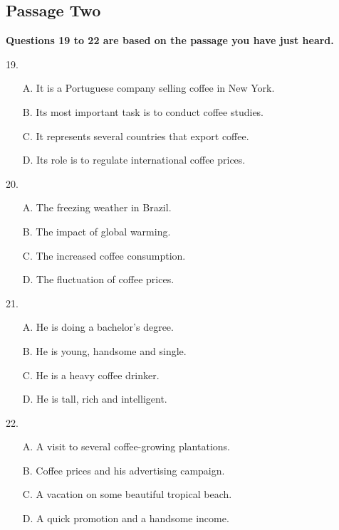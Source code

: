 \documentclass[UTF8,11pt]{ctexart}
\begin{document}
\subsection*{\textbf{Passage Two}}


\textbf{Questions 19 to 22 are based on the passage you have just heard.}


19.


\begin{itemize}[leftmargin=2em,itemsep=.2em,topsep=.4em]\item[A.] It is a Portuguese company selling coffee in New York.
\item[B.] Its most important task is to conduct coffee studies.
\item[C.] It represents several countries that export coffee.
\end{itemize}

\begin{itemize}[leftmargin=2em,itemsep=.2em,topsep=.4em]\item[D.] Its role is to regulate international coffee prices.
\end{itemize}

20.


\begin{itemize}[leftmargin=2em,itemsep=.2em,topsep=.4em]\item[A.] The freezing weather in Brazil.
\item[B.] The impact of global warming.
\item[C.] The increased coffee consumption.
\item[D.] The fluctuation of coffee prices.
\end{itemize}

21.


\begin{itemize}[leftmargin=2em,itemsep=.2em,topsep=.4em]\item[A.] He is doing a bachelor’s degree.
\item[B.] He is young, handsome and single.
\item[C.] He is a heavy coffee drinker.
\item[D.] He is tall, rich and intelligent.
\end{itemize}

22.


\begin{itemize}[leftmargin=2em,itemsep=.2em,topsep=.4em]\item[A.] A visit to several coffee-growing plantations.
\item[B.] Coffee prices and his advertising campaign.
\item[C.] A vacation on some beautiful tropical beach.
\item[D.] A quick promotion and a handsome income.
\end{itemize}
\end{document}
